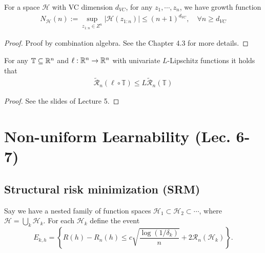 \begin{theorem}
For a space $\mathcal{H}$ with VC dimension $d_{VC}$, for any $z_1, \cdots, z_n$, we have growth function
\begin{align*}
    N_\mathcal{H}(n) := \sup_{z_{1:n} \in Z^n} |\mathcal{H}(z_{1:n})| \leq (n + 1)^{d_{VC}}, \quad \forall n \geq d_{VC}
\end{align*}
\end{theorem}
\begin{proof}
Proof by combination algebra. See the Chapter 4.3 for more details.
\end{proof}

\begin{theorem}
For any $\mathbb{T} \subseteq \mathbb{R}^n$ and $\ell : \mathbb{R}^n \rightarrow \mathbb{R}^n$ with univariate $L$-Lipschitz
functions it holds that
\begin{align*}
    \tilde{\mathcal{R}}_{n}(\ell \circ \mathbb{T}) \leq L \tilde{\mathcal{R}}_{n}(\mathbb{T})
\end{align*}
\end{theorem}
\begin{proof}
See the slides of Lecture 5.
\end{proof}



\section{Non-uniform Learnability (Lec. 6-7)}

\subsection{Structural risk minimization (SRM)}
\begin{definition}[SRM]
Say we have a nested family of function spaces $\mathcal{H}_{1} \subset \mathcal{H}_{2} \subset \cdots$, where $\mathcal{H} = \bigcup_k \mathcal{H}_{k} $. For each $\mathcal{H}_k$ define the event
$$
E_{k, h}=\left\{R(h)-R_{n}(h) \leq c \sqrt{\frac{\log \left(1 / \delta_{k}\right)}{n}}+2 \mathcal{R}_{n}\left(\mathcal{H}_{k}\right)\right\}.
$$
\end{definition}

